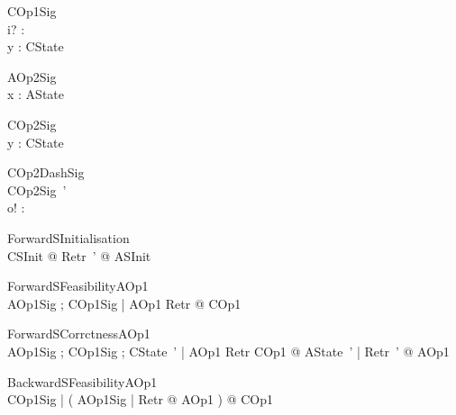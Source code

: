 \begin{schema}{COp1Sig}
\\
 i? : \nat \\
 y : \seq \nat 
\where
 CState
\end{schema}



\begin{schema}{AOp2Sig}
\\
 x : \power \nat 
\where
 AState
\end{schema}



\begin{schema}{COp2Sig}
\\
 y : \seq \nat 
\where
 CState
\end{schema}



\begin{schema}{COp2DashSig}
\\
 COp2Sig~' \\
 o! : \nat
\end{schema}



\begin{theorem}{ ForwardSInitialisation}\\
 \forall CSInit @ \exists Retr~' @ ASInit \\

\end{theorem}



\begin{theorem}{ ForwardSFeasibilityAOp1}\\
 \forall AOp1Sig ; COp1Sig | \pre AOp1 \land Retr @ \pre COp1 \\

\end{theorem}



\begin{theorem}{ ForwardSCorrctnessAOp1}\\
 \forall AOp1Sig ; COp1Sig ; CState~' | \pre AOp1 \land Retr \land COp1 @ \exists AState~' | Retr~' @ AOp1 \\

\end{theorem}



\begin{theorem}{ BackwardSFeasibilityAOp1}\\
 \forall COp1Sig | ( \forall AOp1Sig | Retr @ \pre AOp1 ) @ \pre COp1 \\

\end{theorem}



